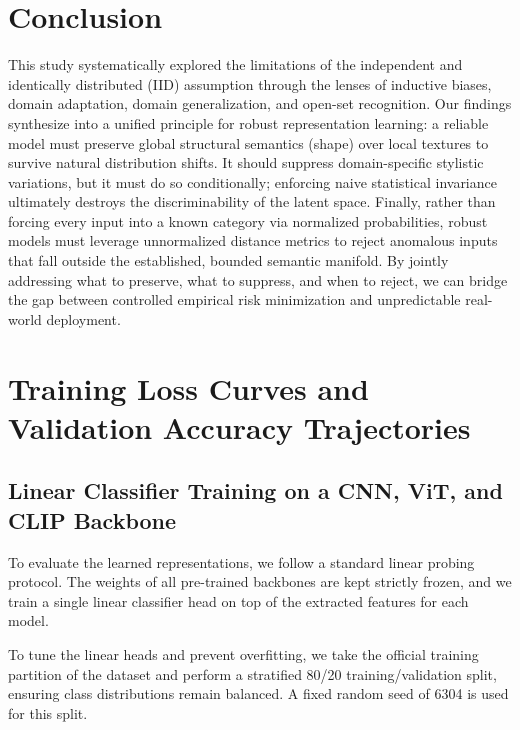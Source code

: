 \documentclass{article}
\begin{document}
\section{Conclusion}

This study systematically explored the limitations of the independent and identically distributed (IID) assumption through the lenses of inductive biases, domain adaptation, domain generalization, and open-set recognition. Our findings synthesize into a unified principle for robust representation learning: a reliable model must preserve global structural semantics (shape) over local textures to survive natural distribution shifts. It should suppress domain-specific stylistic variations, but it must do so conditionally; enforcing naive statistical invariance ultimately destroys the discriminability of the latent space. Finally, rather than forcing every input into a known category via normalized probabilities, robust models must leverage unnormalized distance metrics to reject anomalous inputs that fall outside the established, bounded semantic manifold. By jointly addressing what to preserve, what to suppress, and when to reject, we can bridge the gap between controlled empirical risk minimization and unpredictable real-world deployment.

\newpage

{
\small

 
}

\newpage

\appendix

\section{Training Loss Curves and Validation Accuracy Trajectories}

\subsection{Linear Classifier Training on a CNN, ViT, and CLIP Backbone}
\label{appendix:task1_training}

To evaluate the learned representations, we follow a standard linear probing protocol. The weights of all pre-trained backbones are kept strictly frozen, and we train a single linear classifier head on top of the extracted features for each model. 

To tune the linear heads and prevent overfitting, we take the official training partition of the dataset and perform a stratified 80/20 training/validation split, ensuring class distributions remain balanced. A fixed random seed of 6304 is used for this split.
\end{document}
